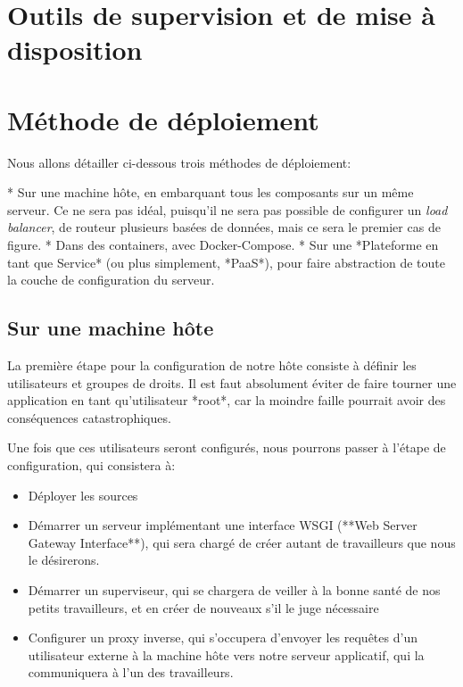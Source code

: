\chapter{Outils de supervision et de mise à disposition}


\chapter{Méthode de déploiement}

Nous allons détailler ci-dessous trois méthodes de déploiement:

* Sur une machine hôte, en embarquant tous les composants sur un même serveur. Ce ne sera pas idéal, puisqu'il ne sera pas possible de configurer un \textit{load balancer}, de routeur plusieurs basées de données, mais ce sera le premier cas de figure.
* Dans des containers, avec Docker-Compose.
* Sur une *Plateforme en tant que Service* (ou plus simplement, *PaaS*), pour faire abstraction de toute la couche de configuration du serveur.

\section{Sur une machine hôte}

La première étape pour la configuration de notre hôte consiste à définir les utilisateurs et groupes de droits. Il est faut absolument éviter de faire tourner une application en tant qu'utilisateur *root*, car la moindre faille pourrait avoir des conséquences catastrophiques.

Une fois que ces utilisateurs seront configurés, nous pourrons passer à l'étape de configuration, qui consistera à:

\begin{itemize}
    \item Déployer les sources
    \item Démarrer un serveur implémentant une interface WSGI (**Web Server Gateway Interface**), qui sera chargé de créer autant de  travailleurs que nous le désirerons.
    \item Démarrer un superviseur, qui se chargera de veiller à la bonne santé de nos petits travailleurs, et en créer de nouveaux s'il le juge nécessaire
    \item Configurer un proxy inverse, qui s'occupera d'envoyer les requêtes d'un utilisateur externe à la machine hôte vers notre serveur applicatif, qui la communiquera à l'un des travailleurs.
\end{itemize}

